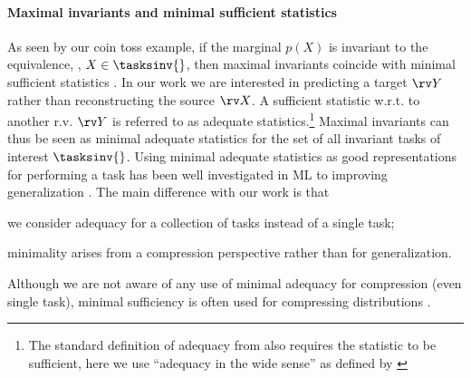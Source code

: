 \documentclass[final]{article}
\begin{document}
\paragraph{Maximal invariants and minimal sufficient statistics}
As seen by our coin toss example, if the marginal $p(X)$ is invariant to the equivalence, \ie, $X \in \tasksinv{}$, then maximal invariants coincide with minimal sufficient statistics  \cite{halmos_application_1949,bahadur_sufficiency_1954}.
In our work we are interested in predicting a target $\rv Y$ rather than reconstructing the source $\rv X$. 
A sufficient statistic w.r.t. to another r.v. $\rv Y$ is referred to as adequate statistics.\footnote{The standard definition of adequacy from \citet{skibinsky_adequate_1967} also requires the statistic to be sufficient, here we use ``adequacy in the wide sense'' as defined by \citet{takeuchi_characterizations_1975}}
Maximal invariants can thus be seen as minimal adequate statistics for the set of all invariant tasks of interest $\tasksinv{}$.
Using minimal adequate statistics as good representations for performing a task has been well investigated in ML to improving generalization \cite{shamir_learning_2010,jiang_learning_2017,cvitkovic_minimal_2019,achille_information_2018,soatto_visual_2016,dubois_learning_2020}.
The main difference with our work is that 
\begin{inlinelist}
\item we consider adequacy for a collection of tasks instead of a single task;
\item minimality arises from a compression perspective rather than for generalization.
\end{inlinelist}
Although we are not aware of any use of minimal adequacy for compression (even single task), minimal sufficiency is often used for compressing distributions \cite{hayashi_minimum_2018,iri_fine_2019}.











\clearpage
\newpage 
\end{document}
